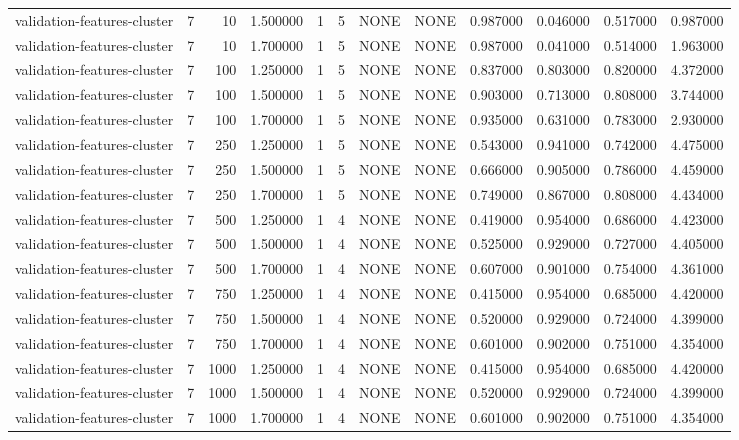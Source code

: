 \begin{tabular}{lrrrllllrrrr}
validation-features-cluster & 7 & 10 & 1.500000 & 1 & 5 & NONE & NONE & 0.987000 & 0.046000 & 0.517000 & 0.987000 \\
validation-features-cluster & 7 & 10 & 1.700000 & 1 & 5 & NONE & NONE & 0.987000 & 0.041000 & 0.514000 & 1.963000 \\
validation-features-cluster & 7 & 100 & 1.250000 & 1 & 5 & NONE & NONE & 0.837000 & 0.803000 & 0.820000 & 4.372000 \\
validation-features-cluster & 7 & 100 & 1.500000 & 1 & 5 & NONE & NONE & 0.903000 & 0.713000 & 0.808000 & 3.744000 \\
validation-features-cluster & 7 & 100 & 1.700000 & 1 & 5 & NONE & NONE & 0.935000 & 0.631000 & 0.783000 & 2.930000 \\
validation-features-cluster & 7 & 250 & 1.250000 & 1 & 5 & NONE & NONE & 0.543000 & 0.941000 & 0.742000 & 4.475000 \\
validation-features-cluster & 7 & 250 & 1.500000 & 1 & 5 & NONE & NONE & 0.666000 & 0.905000 & 0.786000 & 4.459000 \\
validation-features-cluster & 7 & 250 & 1.700000 & 1 & 5 & NONE & NONE & 0.749000 & 0.867000 & 0.808000 & 4.434000 \\
validation-features-cluster & 7 & 500 & 1.250000 & 1 & 4 & NONE & NONE & 0.419000 & 0.954000 & 0.686000 & 4.423000 \\
validation-features-cluster & 7 & 500 & 1.500000 & 1 & 4 & NONE & NONE & 0.525000 & 0.929000 & 0.727000 & 4.405000 \\
validation-features-cluster & 7 & 500 & 1.700000 & 1 & 4 & NONE & NONE & 0.607000 & 0.901000 & 0.754000 & 4.361000 \\
validation-features-cluster & 7 & 750 & 1.250000 & 1 & 4 & NONE & NONE & 0.415000 & 0.954000 & 0.685000 & 4.420000 \\
validation-features-cluster & 7 & 750 & 1.500000 & 1 & 4 & NONE & NONE & 0.520000 & 0.929000 & 0.724000 & 4.399000 \\
validation-features-cluster & 7 & 750 & 1.700000 & 1 & 4 & NONE & NONE & 0.601000 & 0.902000 & 0.751000 & 4.354000 \\
validation-features-cluster & 7 & 1000 & 1.250000 & 1 & 4 & NONE & NONE & 0.415000 & 0.954000 & 0.685000 & 4.420000 \\
validation-features-cluster & 7 & 1000 & 1.500000 & 1 & 4 & NONE & NONE & 0.520000 & 0.929000 & 0.724000 & 4.399000 \\
validation-features-cluster & 7 & 1000 & 1.700000 & 1 & 4 & NONE & NONE & 0.601000 & 0.902000 & 0.751000 & 4.354000 \\

\end{tabular}
